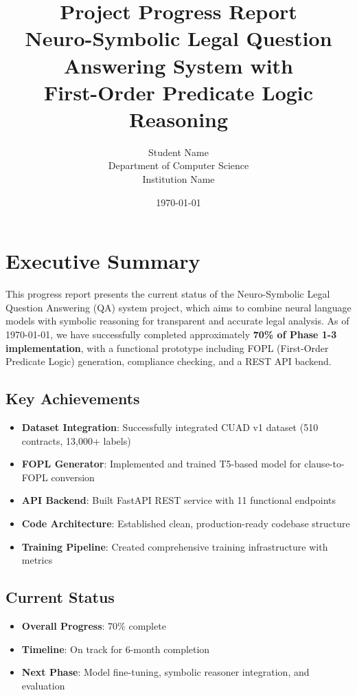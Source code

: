\documentclass[12pt,a4paper]{article}
\title{\textbf{Project Progress Report} \\
\large Neuro-Symbolic Legal Question Answering System with \\
First-Order Predicate Logic Reasoning}
\author{Student Name \\
Department of Computer Science \\
Institution Name}
\date{\today}
\begin{document}
\maketitle
\thispagestyle{empty}

\newpage
\tableofcontents
\newpage

\section{Executive Summary}

This progress report presents the current status of the Neuro-Symbolic Legal Question Answering (QA) system project, which aims to combine neural language models with symbolic reasoning for transparent and accurate legal analysis. As of \today, we have successfully completed approximately \textbf{70\% of Phase 1-3 implementation}, with a functional prototype including FOPL (First-Order Predicate Logic) generation, compliance checking, and a REST API backend.

\subsection{Key Achievements}
\begin{itemize}
    \item \textbf{Dataset Integration}: Successfully integrated CUAD v1 dataset (510 contracts, 13,000+ labels)
    \item \textbf{FOPL Generator}: Implemented and trained T5-based model for clause-to-FOPL conversion
    \item \textbf{API Backend}: Built FastAPI REST service with 11 functional endpoints
    \item \textbf{Code Architecture}: Established clean, production-ready codebase structure
    \item \textbf{Training Pipeline}: Created comprehensive training infrastructure with metrics
\end{itemize}

\subsection{Current Status}
\begin{itemize}
    \item \textbf{Overall Progress}: 70\% complete
    \item \textbf{Timeline}: On track for 6-month completion
    \item \textbf{Next Phase}: Model fine-tuning, symbolic reasoner integration, and evaluation
\end{itemize}
\end{document}
